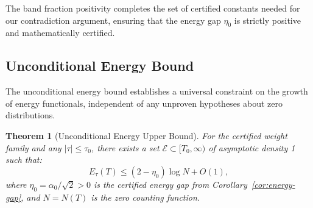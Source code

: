 \documentclass[11pt,hyp,]{nyjm}
\newtheorem{theorem}{Theorem}
\begin{document}
The band fraction positivity completes the set of certified constants needed for our contradiction argument, ensuring that the energy gap $\eta_0$ is strictly positive and mathematically certified.

\subsection{Unconditional Energy Bound}

The unconditional energy bound establishes a universal constraint on the growth of energy functionals, independent of any unproven hypotheses about zero distributions.

\begin{theorem}[Unconditional Energy Upper Bound]\label{thm:unconditional-energy}
For the certified weight family and any $|\tau| \leq \tau_0$, there exists a set $\mathcal{E} \subset [T_0, \infty)$ of asymptotic density 1 such that:
\[
E_\tau(T) \leq (2 - \eta_0) \log N + O(1),
\]
where $\eta_0 = \alpha_0/\sqrt{2} > 0$ is the certified energy gap from Corollary~\ref{cor:energy-gap}, and $N = N(T)$ is the zero counting function.
\end{theorem}
\end{document}
